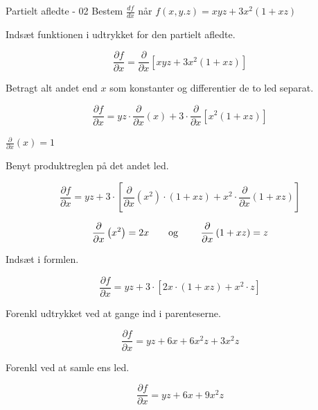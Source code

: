 \documentclass{article}
\begin{document}
\begin{exercise}{Partielt afledte - 02}
Bestem $\frac{df}{dx}$ når $f(x,y.z) =xyz + 3x^2(1 + xz) $


\hint
Indsæt funktionen i udtrykket for den partielt afledte.

\hint

\[
\frac{\partial f}{\partial x} = \frac{\partial }{\partial x} \left[ xyz + 3x^2(1 + xz)\right]
\]

\hint
Betragt alt andet end $x$ som konstanter og differentier de to led separat.

\hint
\[
\frac{\partial f}{\partial x} = yz \cdot \frac{\partial}{\partial x} \left( x \right) + 3 \cdot \frac{\partial }{\partial x} \left[ x^2\left(1 + xz \right) \right]
\]

\hint
$\frac{\partial}{\partial x} (x) = 1$

\hint

Benyt produktreglen på det andet led.

\hint
\[
\frac{\partial f}{\partial x} = yz + 3 \cdot \left[\frac{\partial }{\partial x}\left(x^2 \right) \cdot \left(1 + xz \right) + x^2 \cdot \frac{\partial}{\partial x} \left( 1 + xz\right) \right]
\]

\hint
\[ \frac{\partial }{\partial x} \left(x^2\right) = 2x \textrm{\qquad og \qquad} \frac{\partial }{\partial x} \left(1 + xz\right) = z
\]

\hint
Indsæt i formlen.

\hint
\[
\frac{\partial f}{\partial x} = yz + 3 \cdot \left[2x \cdot \left( 1 + xz\right) + x^2 \cdot z \right]
\]

\hint
Forenkl udtrykket ved at gange ind i parenteserne.

\hint
\[
\frac{\partial f}{\partial x} = yz + 6x + 6x^2z + 3x^2z
\]

\hint
Forenkl ved at samle ens led.

\hint
\[
\frac{\partial f}{\partial x} = yz + 6x + 9x^2z
\]

\end{exercise}

\newpage
\end{document}
